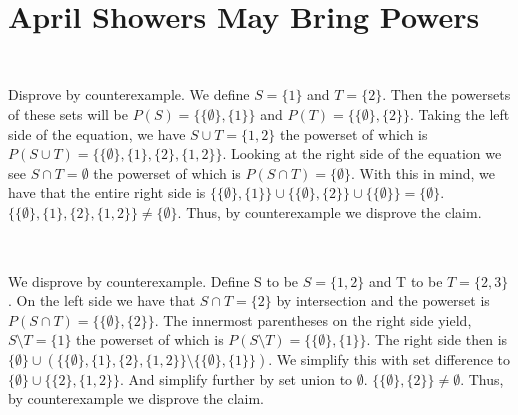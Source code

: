 \documentclass[11pt]{article}
\makeatletter
\def\sm{\setminus}
\renewenvironment{proof}[1][\proofname]{\par
  \normalfont \topsep6\p@\@plus6\p@\relax
  \trivlist
  \item[\hskip\labelsep
        \itshape
    #1\@addpunct{.}]\ignorespaces
}{%
  \endtrivlist\@endpefalse
}
\makeatother
\begin{document}
\section{April Showers May Bring Powers} %
\subsection{} %
\begin{proof}[\textbf{Disprove:} $P(S \cup T) = P(S) \cup P(T) \cup P(S \cap T)$] \leavevmode \\
	Disprove by counterexample. We define $S = \{1\}$ and $T = \{2\}$. Then the powersets of these sets will be $P(S) = \{\{\emptyset\}, \{1\}\}$ and $P(T) = \{\{\emptyset\}, \{2\}\}$. Taking the left side of the equation, we have $S \cup T = \{1, 2\}$ the powerset of which is $P(S \cup T) = \{\{\emptyset\}, \{1\}, \{2\}, \{1, 2\}\}$. Looking at the right side of the equation we see $S \cap T = \emptyset$ the powerset of which is $P(S \cap T) = \{{\emptyset\}}$. With this in mind, we have that the entire right side is $\{\{\emptyset\}, \{1\}\} \cup \{\{\emptyset\}, \{2\}\} \cup \{\{\emptyset\}\} = \{\emptyset\}$. $\{\{\emptyset\}, \{1\}, \{2\}, \{1, 2\}\} \neq \{\emptyset\}$. Thus, by counterexample we disprove the claim. 
\end{proof}

\subsection{} %
	\begin{proof}[\textbf{Disprove:} $P(S \cap T) = \{\emptyset\} \cup (P(S) \sm P(S \sm T))$] \leavevmode \\
		We disprove by counterexample. Define S to be $S = \{1, 2\}$ and T to be $T = \{2, 3\}$. On the left side we have that $S \cap T = \{2\}$ by intersection and the powerset is $P(S \cap T) = \{\{\emptyset\}, \{2\}\}$. The innermost parentheses on the right side yield, $S \sm T = \{1\}$ the powerset of which is $P(S \sm T) = \{\{\emptyset\}, \{1\}\}$. The right side then is $\{\emptyset\} \cup (\{\{\emptyset\}, \{1\}, \{2\}, \{1, 2\}\} \sm \{\{\emptyset\}, \{1\}\})$. We simplify this with set difference to $\{\emptyset\} \cup \{\{2\}, \{1, 2\}\}$. And simplify further by set union to $\emptyset$. $\{\{\emptyset\}, \{2\}\} \neq \emptyset$. Thus, by counterexample we disprove the claim. 
	\end{proof}
\end{document}
